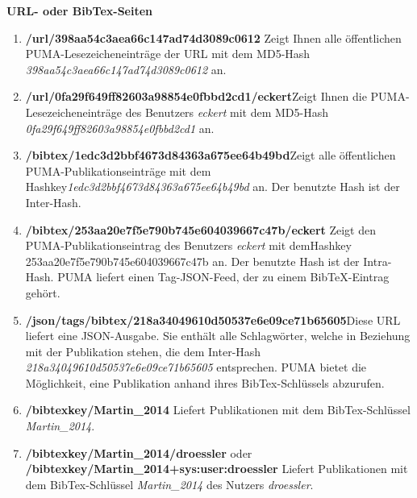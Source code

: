 






\textbf{URL- oder BibTex-Seiten}
\begin{enumerate}
    \item \textbf{/url/398aa54c3aea66c147ad74d3089c0612}\newline
    Zeigt Ihnen alle öffentlichen PUMA-Lesezeicheneinträge der URL mit dem MD5-Hash \textit{398aa54c3aea66c147ad74d3089c0612} an.
    \item \textbf{/url/0fa29f649ff82603a98854e0fbbd2cd1/eckert}\newline Zeigt Ihnen die PUMA-Lesezeicheneinträge des Benutzers \textit{eckert} mit dem MD5-Hash \textit{0fa29f649ff82603a98854e0fbbd2cd1} an.
	\item \textbf{/bibtex/1edc3d2bbf4673d84363a675ee64b49bd}\newline Zeigt alle öffentlichen PUMA-Publikationseinträge mit dem Hashkey\newline \textit{1edc3d2bbf4673d84363a675ee64b49bd} an. Der benutzte Hash ist der Inter-Hash.
    \item \textbf{/bibtex/253aa20e7f5e790b745e604039667c47b/eckert}\newline
    Zeigt den PUMA-Publikationseintrag des Benutzers \textit{eckert} mit dem\newline Hashkey 253aa20e7f5e790b745e604039667c47b an. Der benutzte Hash ist der Intra-Hash. PUMA liefert einen Tag-JSON-Feed, der zu einem BibTeX-Eintrag gehört.
    \item \textbf{/json/tags/bibtex/218a34049610d50537e6e09ce71b65605}\newline Diese URL liefert eine JSON-Ausgabe. Sie enthält alle Schlagwörter, welche in Beziehung mit der Publikation stehen, die dem Inter-Hash \textit{218a34049610d50537e6e09ce71b65605} entsprechen. PUMA bietet die Möglichkeit, eine Publikation anhand ihres BibTex-Schlüssels abzurufen.
    \item \textbf{/bibtexkey/Martin\_2014} \newline
    Liefert Publikationen mit dem BibTex-Schlüssel \textit{Martin\_2014}.
    \item \textbf{/bibtexkey/Martin\_2014/droessler} 
    oder \newline \textbf{/bibtexkey/Martin\_2014+sys:user:droessler}\newline
    Liefert Publikationen mit dem BibTex-Schlüssel \textit{Martin\_2014} des Nutzers \textit{droessler}.

\end{enumerate}
